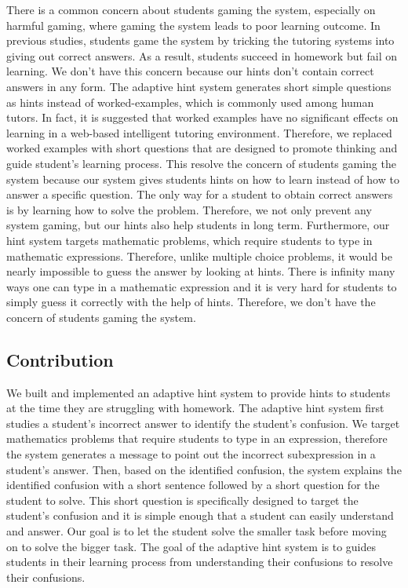 \documentclass{llncs}
\begin{document}
There is a common concern about students gaming the system, especially on harmful gaming, where gaming the system leads to poor learning outcome\cite{Baker2004}\cite{Baker2005}. In previous studies, students game the system by tricking the tutoring systems into giving out correct answers\cite{Baker2004Off-task}. As a result, students succeed in homework but fail on learning. We don't have this concern because our hints don't contain correct answers in any form. The adaptive hint system generates short simple questions as hints instead of worked-examples, which is commonly used among human tutors\cite{Atkinson2000}. In fact, it is suggested that worked examples have no significant effects on learning in a web-based intelligent tutoring environment\cite{McLaren2006}. Therefore, we replaced worked examples with short questions that are designed to promote thinking and guide student's learning process. This resolve the concern of students gaming the system because our system gives students hints on how to learn instead of how to answer a specific question. The only way for a student to obtain correct answers is by learning how to solve the problem. Therefore, we not only prevent any system gaming, but our hints also help students in long term. Furthermore, our hint system targets mathematic problems, which require students to type in mathematic expressions. Therefore, unlike multiple choice problems, it would be nearly impossible to guess the answer by looking at hints. There is infinity many ways one can type in a mathematic expression and it is very hard for students to simply guess it correctly with the help of hints. Therefore, we don't have the concern of students gaming the system.

\subsection*{Contribution}
We built and implemented an adaptive hint system to provide hints to students at the time they are struggling with homework. The adaptive hint system first studies a student's incorrect answer to identify the student's confusion. We target mathematics problems that require students to type in an expression, therefore the system generates a message to point out the incorrect subexpression in a student's answer. Then, based on the identified confusion, the system explains the identified confusion with a short sentence followed by a short question for the student to solve. This short question is specifically designed to target the student's confusion and it is simple enough that a student can easily understand and answer. Our goal is to let the student solve the smaller task before moving on to solve the bigger task. The goal of the adaptive hint system is to guides students in their learning process from understanding their confusions to resolve their confusions.
\end{document}
